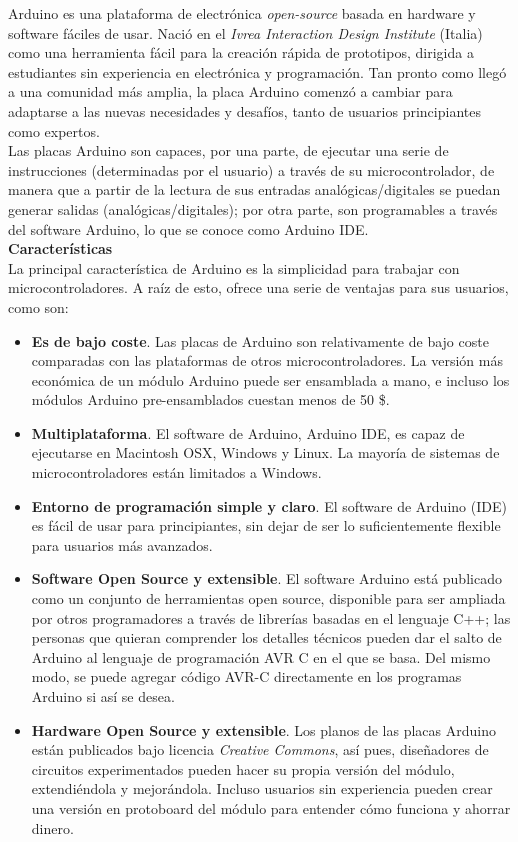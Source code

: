 \documentclass[12pt]{article}
\begin{document}
	\noindent Arduino es una plataforma de electrónica \textit{open-source} basada en hardware y software fáciles de usar. Nació en el \textit{Ivrea Interaction Design Institute} (Italia) como una herramienta fácil para la creación rápida de prototipos, dirigida a estudiantes sin experiencia en electrónica y programación. Tan pronto como llegó a una comunidad más amplia, la placa Arduino comenzó a cambiar para adaptarse a las nuevas necesidades y desafíos, tanto de usuarios principiantes como expertos. \\
	
	\noindent Las placas Arduino son capaces, por una parte, de ejecutar una serie de instrucciones (determinadas por el usuario) a través de su microcontrolador, de manera que a partir de la lectura de sus entradas analógicas/digitales se puedan generar salidas (analógicas/digitales); por otra parte, son programables a través del software Arduino, lo que se conoce como Arduino IDE. \\
	
	\noindent \textbf{Características} \\
	
	\noindent La principal característica de Arduino es la simplicidad para trabajar con microcontroladores. A raíz de esto, ofrece una serie de ventajas para sus usuarios, como son:
	\begin{itemize}
		\item \textbf{Es de bajo coste}. Las placas de Arduino son relativamente de bajo coste comparadas con las plataformas de otros microcontroladores. La versión más económica de un módulo Arduino puede ser ensamblada a mano, e incluso los módulos Arduino pre-ensamblados cuestan menos de 50 \$.
		\item \textbf{Multiplataforma}. El software de Arduino, Arduino IDE, es capaz de ejecutarse en Macintosh OSX, Windows y Linux. La mayoría de sistemas de microcontroladores están limitados a Windows.
		\item  	\textbf{Entorno de programación simple y claro}. El software de Arduino (IDE) es fácil de usar para principiantes, sin dejar de ser lo suficientemente flexible para usuarios más avanzados.
		\item \textbf{Software Open Source y extensible}. El software Arduino está publicado como un conjunto de herramientas open source, disponible para ser ampliada por otros programadores a través de librerías basadas en el lenguaje C++; las personas que quieran comprender los detalles técnicos pueden dar el salto de Arduino al lenguaje de programación AVR C en el que se basa. Del mismo modo, se puede agregar código AVR-C directamente en los  programas Arduino si así se desea.
		\item \textbf{Hardware Open Source y extensible}. Los planos de las placas Arduino están publicados bajo licencia \textit{Creative Commons}, así pues, diseñadores de circuitos experimentados pueden hacer su propia versión del módulo, extendiéndola y mejorándola. Incluso usuarios sin experiencia pueden crear una versión en protoboard del módulo para entender cómo funciona y ahorrar dinero.
	
	\end{itemize}
\end{document}
